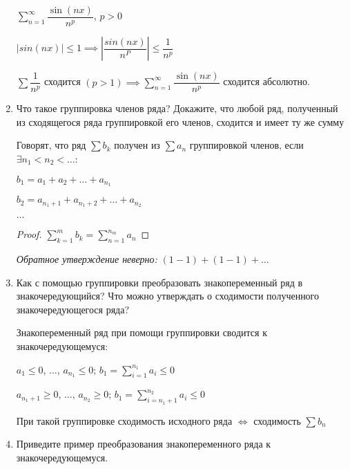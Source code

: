 \documentclass[a4paper]{article}
\begin{document}
\begin{enumerate}
        \begin{example}
        $\sum_{n=1}^{\infty} \dfrac{\sin(nx)}{n^p}$, $p > 0$
        
        $|sin(nx)| \leq 1 \implies \left|\dfrac{sin(nx)}{n^P}\right| \leq \dfrac{1}{n^p}$
        
        $\sum \dfrac{1}{n^p} $ сходится $(p > 1) \implies \sum_{n=1}^{\infty} \dfrac{\sin(nx)}{n^p}$ сходится абсолютно.
        \end{example}

        \item Что такое группировка членов ряда? Докажите, что любой ряд, полученный из сходящегося ряда группировкой его членов, сходится и имеет ту же сумму
        
        Говорят, что ряд $\sum b_k$ получен из $\sum a_n$ группировкой членов, если $\exists n_1 < n_2 < \dots$:

        $b_1 = a_1 + a_2 + \dots + a_{n_1}$

        $b_2 = a_{n_1 + 1} + a_{n_1 + 2} + \dots + a_{n_2}$

        $\dots$

        \begin{comment}
            Если $\sum a_n$ сходится, то ряд $\sum b_k$ сходится к той же сумме.
        \end{comment}

        \begin{proof}
        $\sum_{k=1}^{m} b_k = \sum_{n=1}^{n_m} a_n$
        \end{proof}

        \textit{Обратное утверждение неверно:} $(1 - 1) + (1 - 1) + \dots$

        \item Как с помощью группировки преобразовать знакопеременный ряд в знакочередующийся? Что можно утверждать о сходимости полученного знакочередующегося ряда?
        
        Знакопеременный ряд при помощи группировки сводится к знакочередующемуся:

        $a_1 \leq 0$, $\dots$, $a_{n_1} \leq 0$; $b_1 = \sum_{i=1}^{n_1} a_i \leq 0$

        $a_{n_1+1} \geq 0$, $\dots$, $a_{n_2} \geq 0$; $b_1 = \sum_{i={n_1 + 1}}^{n_2} a_i \leq 0$

        При такой группировке сходимость исходного ряда $\iff$ сходимость $\sum b_n$

        \item Приведите пример преобразования знакопеременного ряда к знакочередующемуся.


\end{enumerate}
\end{document}

